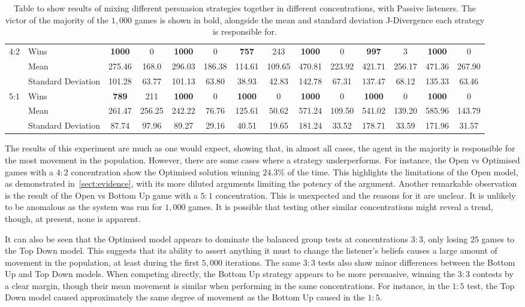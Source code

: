 \begin{table}[H]
\begin{adjustbox}{max width = \textwidth}
\begin{tabular}{ll||cc|cc|cc|cc|cc|cc}
\multirow{3}{*}{4:2} & Wins & \textbf{1000} & 0 & \textbf{1000} & 0 & \textbf{757} & 243 & \textbf{1000} & 0 & \textbf{997} & 3 & \textbf{1000} & 0 \\
 & Mean & 275.46 & 168.0 & 296.03 & 186.38 & 114.61 & 109.65 & 470.81 & 223.92 & 421.71 & 256.17 & 471.36 & 267.90 \\
 & Standard Deviation & 101.28 & 63.77 & 101.13 & 63.80 & 38.93 & 42.83 & 142.78 & 67.31 & 137.47 & 68.12 & 135.33 & 63.46 \\ \hline
\multirow{3}{*}{5:1} & Wins & \textbf{789} & 211 & \textbf{1000} & 0 & \textbf{1000} & 0 & \textbf{1000} & 0 & \textbf{1000} & 0 & \textbf{1000} & 0 \\
 & Mean & 261.47 & 256.25 & 242.22 & 76.76 & 125.61 & 50.62 & 571.24 & 109.50 & 541.02 & 139.20 & 585.96 & 143.79 \\
 & Standard Deviation & 87.74 & 97.96 & 89.27 & 29.16 & 40.51 & 19.65 & 181.24 & 33.52 & 178.71 & 33.59 & 171.96 & 31.57
\end{tabular}
\end{adjustbox}
\caption{Table to show results of mixing different persuasion strategies together in different concentrations, with Passive listeners. The victor of the majority of the $1,000$ games is shown in bold, alongside the mean and standard deviation J-Divergence each strategy is responsible for. }
\end{table}


The results of this experiment are much as one would expect, showing that, in almost all cases, the agent in the majority is responsible for the most movement in the population. However, there are some cases where a strategy underperforms. For instance, the Open vs Optimised games with a $4:2$ concentration show the Optimised solution winning $24.3 \%$ of the time. This highlights the limitations of the Open model, as demonstrated in~\cref{sect:evidence}, with its more diluted arguments limiting the potency of the argument. Another remarkable observation is the result of the Open vs Bottom Up game with a $5:1$ concentration. This is unexpected and the reasons for it are unclear. It is unlikely to be anomalous as the system was run for $1,000$ games. It is possible that testing other similar concentrations might reveal a trend, though, at present, none is apparent.

It can also be seen that the Optimised model appears to dominate the balanced group tests at concentrations $3:3$, only losing $25$ games to the Top Down model. This suggests that its ability to assert anything it must to change the listener's beliefs causes a large amount of movement in the population, at least during the first $5,000$ iterations. The same $3:3$ tests also show minor differences between the Bottom Up and Top Down models. When competing directly, the Bottom Up strategy appears to be more persuasive, winning the $3:3$ contests by a clear margin, though their mean movement is similar when performing in the same concentrations. For instance, in the $1:5$ test, the Top Down model caused approximately the same degree of movement as the Bottom Up caused in the $1:5$. 

